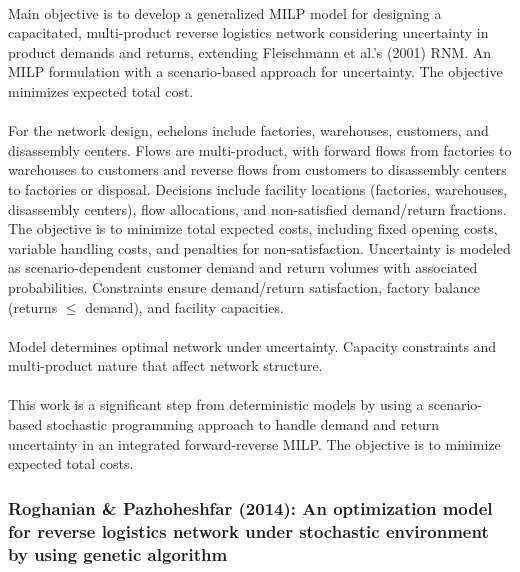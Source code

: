 \paragraph{} Main objective is to develop a generalized MILP model for designing a capacitated, multi-product reverse logistics network considering uncertainty in product demands and returns, extending Fleischmann et al.'s (2001) RNM. An MILP formulation with a scenario-based approach for uncertainty. The objective minimizes expected total cost.

\paragraph{} For the network design, echelons include factories, warehouses, customers, and disassembly centers. Flows are multi-product, with forward flows from factories to warehouses to customers and reverse flows from customers to disassembly centers to factories or disposal. Decisions include facility locations (factories, warehouses, disassembly centers), flow allocations, and non-satisfied demand/return fractions. The objective is to minimize total expected costs, including fixed opening costs, variable handling costs, and penalties for non-satisfaction. Uncertainty is modeled as scenario-dependent customer demand and return volumes with associated probabilities. Constraints ensure demand/return satisfaction, factory balance (returns $\le$ demand), and facility capacities.

\paragraph{} Model determines optimal network under uncertainty. Capacity constraints and multi-product nature that affect network structure.

\paragraph{} This work is a significant step from deterministic models by using a scenario-based stochastic programming approach to handle demand and return uncertainty in an integrated forward-reverse MILP. The objective is to minimize expected total costs.

\subsubsection{Roghanian \& Pazhoheshfar (2014): An optimization model for reverse logistics network under stochastic environment by using genetic algorithm}


